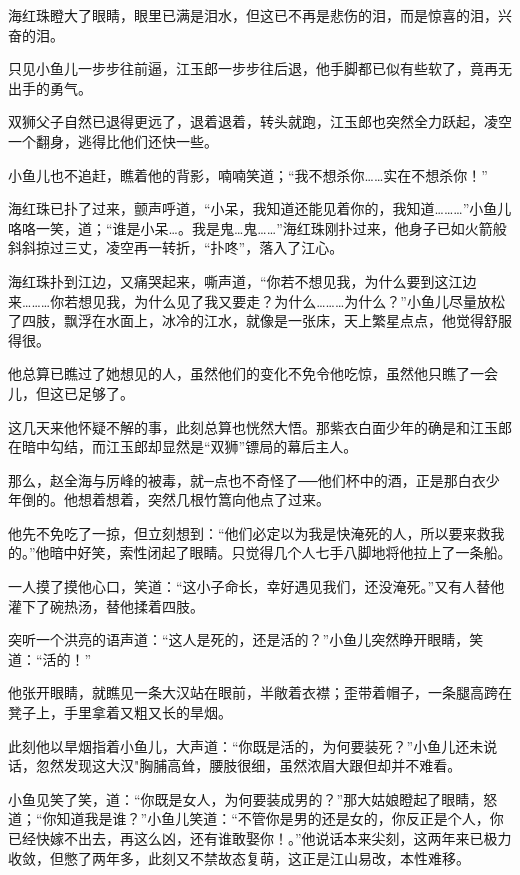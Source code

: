 \documentclass[12pt,oneside]{book}
\begin{document}
海红珠瞪大了眼睛，眼里已满是泪水，但这已不再是悲伤的泪，而是惊喜的泪，兴奋的泪。

只见小鱼儿一步步往前逼，江玉郎一步步往后退，他手脚都已似有些软了，竟再无出手的勇气。

双狮父子自然已退得更远了，退着退着，转头就跑，江玉郎也突然全力跃起，凌空一个翻身，逃得比他们还快一些。

小鱼儿也不追赶，瞧着他的背影，喃喃笑道；``我不想杀你\ldots\ldots 实在不想杀你！''

海红珠已扑了过来，颤声呼道，``小呆，我知道还能见着你的，我知道\ldots\ldots\ldots{}''小鱼儿咯咯一笑，道；``谁是小呆\ldots。我是鬼\ldots 鬼\ldots\ldots{}''海红珠刚扑过来，他身子已如火箭般斜斜掠过三丈，凌空再一转折，``扑咚''，落入了江心。

海红珠扑到江边，又痛哭起来，嘶声道，``你若不想见我，为什么要到这江边来\ldots\ldots\ldots 你若想见我，为什么见了我又要走？为什么\ldots\ldots\ldots 为什么？''小鱼儿尽量放松了四肢，飘浮在水面上，冰冷的江水，就像是一张床，天上繁星点点，他觉得舒服得很。

他总算已瞧过了她想见的人，虽然他们的变化不免令他吃惊，虽然他只瞧了一会儿，但这已足够了。

这几天来他怀疑不解的事，此刻总算也恍然大悟。那紫衣白面少年的确是和江玉郎在暗中勾结，而江玉郎却显然是``双狮''镖局的幕后主人。

那么，赵全海与厉峰的被毒，就─点也不奇怪了──他们杯中的酒，正是那白衣少年倒的。他想着想着，突然几根竹篙向他点了过来。

他先不免吃了一掠，但立刻想到：``他们必定以为我是快淹死的人，所以要来救我的。''他暗中好笑，索性闭起了眼睛。只觉得几个人七手八脚地将他拉上了一条船。

一人摸了摸他心口，笑道：``这小子命长，幸好遇见我们，还没淹死。''又有人替他灌下了碗热汤，替他揉着四肢。

突听一个洪亮的语声道：``这人是死的，还是活的？''小鱼儿突然睁开眼睛，笑道：``活的！''

他张开眼睛，就瞧见一条大汉站在眼前，半敞着衣襟；歪带着帽子，一条腿高跨在凳子上，手里拿着又粗又长的旱烟。

此刻他以旱烟指着小鱼儿，大声道：``你既是活的，为何要装死？''小鱼儿还未说话，忽然发现这大汉"胸脯高耸，腰肢很细，虽然浓眉大跟但却并不难看。

小鱼见笑了笑，道：``你既是女人，为何要装成男的？''那大姑娘瞪起了眼睛，怒道；``你知道我是谁？''小鱼儿笑道：``不管你是男的还是女的，你反正是个人，你已经快嫁不出去，再这么凶，还有谁敢娶你！。''他说话本来尖刻，这两年来已极力收敛，但憋了两年多，此刻又不禁故态复萌，这正是江山易改，本性难移。
\end{document}
